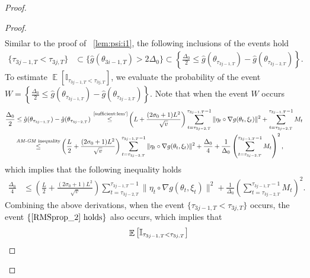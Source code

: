 \documentclass[standalone]{article}
\newcommand{\I}{\mathbb{I}}
\DeclareMathOperator{\Expect}{\mathbb{E}}
\begin{document}
\begin{proof}
\begin{proof}
\begin{align}
\end{align}
Similar to the proof of ~\cref{lem:psi:i1}, the following inclusions of the events hold
\begin{align*}
\{\tau_{3j-1,T}<\tau_{3j,T}\}&\subset \{\hat{g}(\theta_{3i-1,T})>2\Delta_{0}\}\subset\left\{\frac{\Delta_{0}}{2}\le \hat{g}(\theta_{\tau_{3j-1,T}})-\hat{g}(\theta_{\tau_{3j-2,T}})\right\}.%
\end{align*}
To estimate \(\Expect\left[\I_{\tau_{3j-1,T}<\tau_{3j,T}}\right]\), we evaluate the probability of the event \(W=\left\{\frac{\Delta_{0}}{2}\le \hat{g}(\theta_{\tau_{3j-1,T}})-\hat{g}(\theta_{\tau_{3j-2,T}})\right\}.\) Note that when the event $W$ occurs 
\begin{align*}
    \frac{\Delta_{0}}{2}&\le \hat{g}(\theta_{\tau_{3j-1,T}})-\hat{g}(\theta_{\tau_{3j-2,T}}) \mathop{\le}^{\text{ \cref{sufficient:lem'}}}\left({ L}+\frac{(2\sigma_{0}+1) L^{2}}{\sqrt{v}}\right)\sum_{t=\tau_{3j-2,T}}^{\tau_{3j-1,T}-1}\|\eta_t\circ \nabla g(\theta_{t},\xi_{t})\|^{2}+\sum_{t=\tau_{3j-2,T}}^{\tau_{3j-1,T}-1}M_{t}\\&\mathop{\le}^{\text{\emph{AM-GM} inequality}}\left(\frac{ L}{2}+\frac{(2\sigma_{0}+1) L^{2}}{\sqrt{v}}\right)\sum_{t=\tau_{3j-2,T}}^{\tau_{3j-1,T}-1}\|\eta_t\circ \nabla g(\theta_{t},\xi_{t})\|^{2}+\frac{\Delta_{0}}{4}+\frac{1}{\Delta_{0}}\left(\sum_{t=\tau_{3j-2,T}}^{\tau_{3j-1,T}-1}M_{t}\right)^{2},
\end{align*}
which implies that the following inequality holds
\begin{align}\label{RMSprop_2}
    \frac{\Delta_{0}}{4}&\le\left(\frac{ L}{2}+\frac{(2\sigma_{0}+1) L^{2}}{\sqrt{v}}\right)\sum_{t=\tau_{3j-2,T}}^{\tau_{3j-1,T}-1}\|\eta_t\circ \nabla g(\theta_{t},\xi_{t})\|^{2}+\frac{1}{\Delta_{0}}\left(\sum_{t=\tau_{3j-2,T}}^{\tau_{3j-1,T}-1}M_{t}\right)^{2}.
\end{align}
Combining the above derivations, when the event \(\{\tau_{3j-1,T}<\tau_{3j,T}\}\) occurs, the event \(\{\text{\cref{RMSprop_2} holds}\}\) also occurs, which implies that
\begin{align}\label{RMSProp_2}
&\quad \Expect\left[\I_{\tau_{3j-1,T}<\tau_{3j,T}}\right] \notag \\

\end{align}
\end{proof}
\end{proof}
\end{document}
